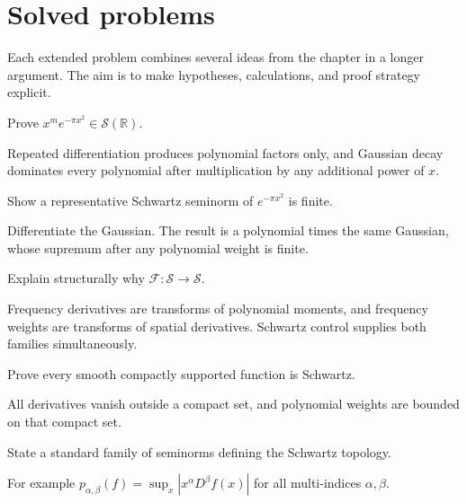 \section{Solved problems}
Each extended problem combines several ideas from the chapter in a longer argument. The aim is to make hypotheses, calculations, and proof strategy explicit.

\begin{problem}\label{prob:iii14-problem-01}
Prove \(x^me^{-\pi x^2}\in\mathcal S(\mathbb R)\).
\end{problem}
\begin{solution}
Repeated differentiation produces polynomial factors only, and Gaussian
decay dominates every polynomial after multiplication by any additional
power of \(x\).
\end{solution}

\begin{problem}\label{prob:iii14-problem-02}
Show a representative Schwartz seminorm of \(e^{-\pi x^2}\) is finite.
\end{problem}
\begin{solution}
Differentiate the Gaussian. The result is a polynomial times the same
Gaussian, whose supremum after any polynomial weight is finite.
\end{solution}

\begin{problem}\label{prob:iii14-problem-03}
Explain structurally why \(\mathcal F:\mathcal S\to\mathcal S\).
\end{problem}
\begin{solution}
Frequency derivatives are transforms of polynomial moments, and frequency
weights are transforms of spatial derivatives. Schwartz control supplies both
families simultaneously.
\end{solution}

\begin{problem}\label{prob:iii14-problem-04}
Prove every smooth compactly supported function is Schwartz.
\end{problem}
\begin{solution}
All derivatives vanish outside a compact set, and polynomial weights are
bounded on that compact set.
\end{solution}

\begin{problem}\label{prob:iii14-problem-05}
State a standard family of seminorms defining the Schwartz topology.
\end{problem}
\begin{solution}
For example
\(p_{\alpha,\beta}(f)=\sup_x|x^\alpha D^\beta f(x)|\) for all multi-indices
\(\alpha,\beta\).
\end{solution}

